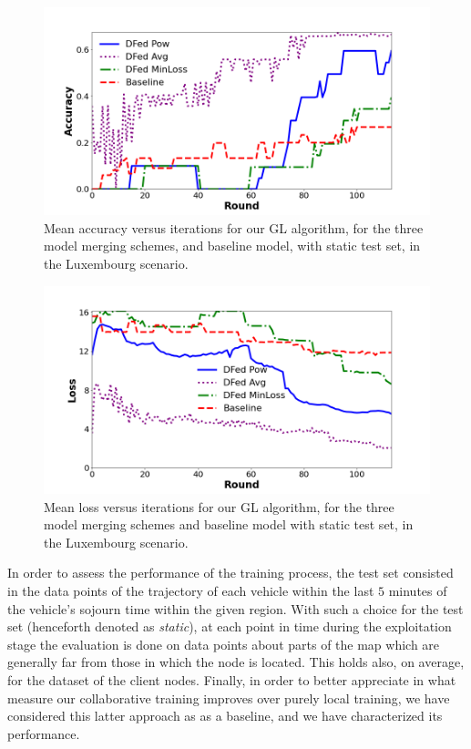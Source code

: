 \begin{figure}[t!]
\centering
\includegraphics[width=1\columnwidth]{figures/accFixTest3.png} 
\caption{Mean accuracy versus iterations for our GL algorithm, for the three model merging schemes, and baseline model, with static test set, in the Luxembourg scenario.\vspace{-0.3in}}
\label{fig:accuracy}
\end{figure}
%
\begin{figure}[t!]
\centering
\includegraphics[width=1\columnwidth]{figures/lossFixedSet3.png} 
\caption{Mean loss versus iterations for our GL algorithm, for the three model merging schemes and baseline model with static test set, in the Luxembourg scenario. \vspace{-0.2in}}
\label{fig:loss}
\end{figure}
%
In order to assess the performance of the training process, the test set consisted in the data points of the trajectory of each vehicle within the last $5$ minutes of the vehicle's sojourn time within the given region. With such a choice for the test set (henceforth denoted as \textit{static}), at each point in time during the exploitation stage the evaluation is done on data points about parts of the map which are generally far from those in which the node is located. This holds also, on average, for the dataset of the client nodes. Finally, in order to better appreciate in what measure our collaborative training improves over purely local training, we have considered this latter approach as as a baseline, and we have characterized its performance.\\
